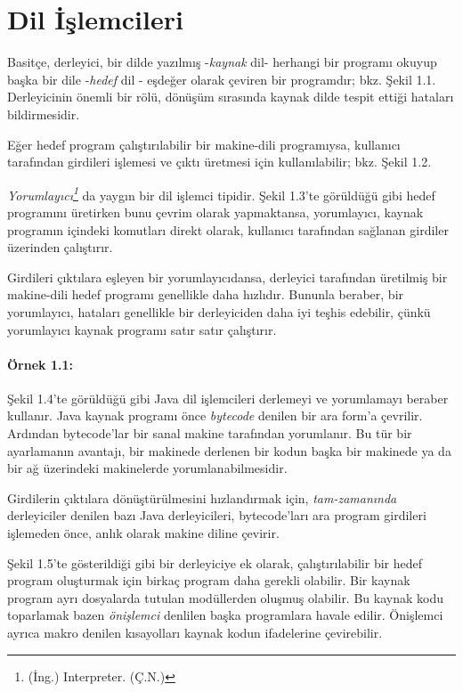\section{Dil İşlemcileri}

Basitçe, derleyici, bir dilde yazılmış -\textit{kaynak} dil- herhangi bir programı okuyup başka bir dile -\textit{hedef} dil -  eşdeğer olarak çeviren bir programdır; bkz. Şekil 1.1. Derleyicinin önemli bir rölü, dönüşüm sırasında kaynak dilde tespit ettiği hataları bildirmesidir.



Eğer hedef program çalıştırılabilir bir makine-dili programıysa, kullanıcı tarafından girdileri işlemesi ve çıktı üretmesi için kullanılabilir; bkz. Şekil 1.2.



\renewcommand{\thefootnote}{\fnsymbol{footnote}}
\textit{Yorumlayıcı\footnote{(İng.) Interpreter. (Ç.N.)}} da yaygın bir dil işlemci tipidir. Şekil 1.3'te görüldüğü gibi hedef programını üretirken bunu çevrim olarak yapmaktansa, yorumlayıcı, kaynak programın içindeki komutları direkt olarak, kullanıcı tarafından sağlanan girdiler üzerinden çalıştırır.



Girdileri çıktılara eşleyen bir yorumlayıcıdansa, derleyici tarafından üretilmiş bir makine-dili hedef programı genellikle daha hızlıdır. Bununla beraber, bir yorumlayıcı, hataları genellikle bir derleyiciden daha iyi teşhis edebilir, çünkü yorumlayıcı kaynak programı satır satır çalıştırır.

\paragraph{Örnek 1.1:}
Şekil 1.4'te görüldüğü gibi Java dil işlemcileri derlemeyi ve yorumlamayı beraber kullanır. Java kaynak programı önce \textit{bytecode} denilen bir ara form'a çevrilir. Ardından bytecode'lar bir sanal makine tarafından yorumlanır. Bu tür bir ayarlamanın avantajı, bir makinede derlenen bir kodun başka bir makinede ya da bir ağ üzerindeki makinelerde yorumlanabilmesidir.

Girdilerin çıktılara dönüştürülmesini hızlandırmak için, \textit{tam-zamanında} derleyiciler denilen bazı Java derleyicileri, bytecode'ları ara program girdileri işlemeden önce,  anlık olarak makine diline çevirir. 



Şekil 1.5'te gösterildiği gibi bir derleyiciye ek olarak, çalıştırılabilir bir hedef program oluşturmak için birkaç program daha gerekli olabilir. Bir kaynak program ayrı dosyalarda tutulan modüllerden oluşmuş olabilir. Bu kaynak kodu toparlamak bazen \textit{önişlemci} denlilen başka programlara havale edilir. Önişlemci ayrıca makro denilen kısayolları kaynak kodun ifadelerine çevirebilir.

